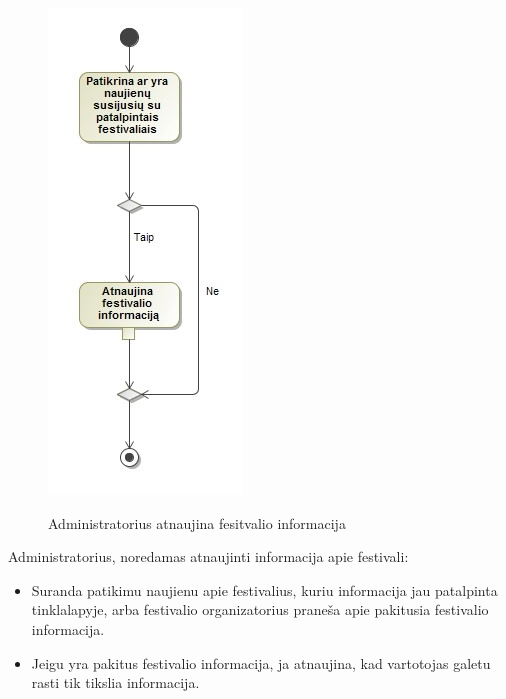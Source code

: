 ﻿\documentclass{VUMIFPSkursinis}
\begin{document}
\begin{figure}[H]
    \centering
    \includegraphics[scale=0.7]{img/geri/adminAtnaujinti}
    \label{img:uml14}
	\caption{Administratorius atnaujina fesitvalio informacija}
\end{figure}

Administratorius, noredamas atnaujinti informacija apie festivali:
\begin{itemize}
\item Suranda patikimu naujienu apie festivalius, kuriu informacija jau patalpinta tinklalapyje, arba festivalio organizatorius praneša apie pakitusia festivalio informacija.
\item Jeigu yra pakitus festivalio informacija, ja atnaujina, kad vartotojas galetu rasti tik tikslia informacija.  
\end{itemize}
\end{document}
